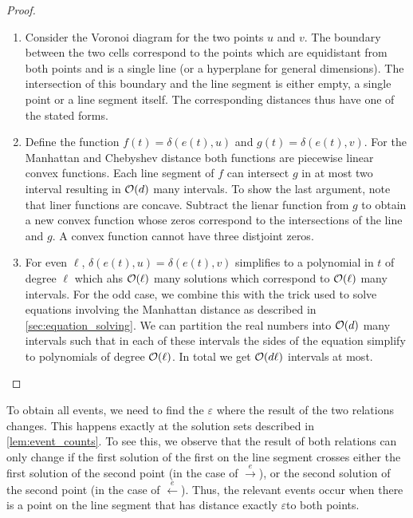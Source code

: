 \begin{proof}
  \begin{enumerate}
		\item Consider the Voronoi diagram for the two points \(u\) and \(v\). The boundary between the two cells correspond to the points which are equidistant from both points and is a single line (or a hyperplane for general dimensions). The intersection of this boundary and the line segment is either empty, a single point or a line segment itself. The corresponding distances thus have one of the stated forms. 

		\item Define the function \(f(t) = \delta(e(t), u)\) and \(g(t) = \delta(e(t), v)\). For the Manhattan and Chebyshev distance both functions are piecewise linear convex functions. Each line segment of \(f\) can intersect \(g\) in at most two interval resulting in \(\mathcal{O}(d)\) many intervals. To show the last argument, note that liner functions are concave. Subtract the lienar function from \(g\) to obtain a new convex function whose zeros correspond to the intersections of the line and \(g\). A convex function cannot have three distjoint zeros.

		\item For even \(\ell\), \(\delta(e(t), u) = \delta(e(t),v)\) simplifies to a polynomial in \(t\) of degree \(\ell\) which ahs \(\mathcal{O}(\ell)\) many solutions which correspond to \(\mathcal{O}(\ell)\) many intervals. For the odd case, we combine this with the trick used to solve equations involving the Manhattan distance as described in \cref{sec:equation_solving}. We can partition the real numbers into \(\mathcal{O}(d)\) many intervals such that in each of these intervals the sides of the equation simplify to polynomials of degree \(\mathcal{O}(\ell)\). In total we get \(\mathcal{O}(d\ell)\) intervals at most. 
  \end{enumerate}
\end{proof}

To obtain all events, we need to find the \(\varepsilon\) where the result of the two relations changes. This happens exactly at the solution sets described in \cref{lem:event_counts}. To see this, we observe that the result of both relations can only change if the first solution of the first on the line segment crosses either the first solution of the second point (in the case of \(\overset e\rightarrow\)), or the second solution of the second point (in the case of \(\overset e\leftarrow\)). Thus, the relevant events occur when there is a point on the line segment that has distance exactly \(\varepsilon\)to both points. 

